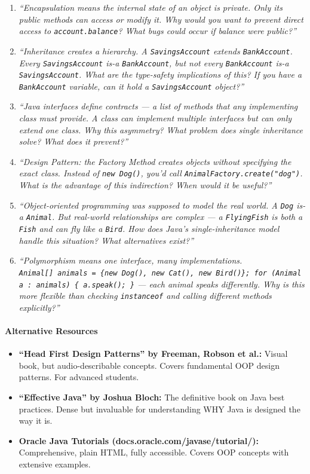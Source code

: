 \documentclass[
  justified,
  openright,
]{tufte-book}
\let\paragraph\paragraph
\let\paragraph\paragraph
\providecommand{\tightlist}{%
  \setlength{\itemsep}{0pt}\setlength{\parskip}{0pt}}
\begin{document}
\begin{enumerate}
\def\labelenumi{\arabic{enumi}.}
\item
  \emph{``Encapsulation means the internal state of an object is
  private. Only its public methods can access or modify it. Why would
  you want to prevent direct access to \texttt{account.balance}? What
  bugs could occur if balance were public?''}
\item
  \emph{``Inheritance creates a hierarchy. A \texttt{SavingsAccount}
  extends \texttt{BankAccount}. Every \texttt{SavingsAccount} is-a
  \texttt{BankAccount}, but not every \texttt{BankAccount} is-a
  \texttt{SavingsAccount}. What are the type-safety implications of
  this? If you have a \texttt{BankAccount} variable, can it hold a
  \texttt{SavingsAccount} object?''}
\item
  \emph{``Java interfaces define contracts --- a list of methods that
  any implementing class must provide. A class can implement multiple
  interfaces but can only extend one class. Why this asymmetry? What
  problem does single inheritance solve? What does it prevent?''}
\item
  \emph{``Design Pattern: the Factory Method creates objects without
  specifying the exact class. Instead of \texttt{new\ Dog()}, you'd call
  \texttt{AnimalFactory.create("dog")}. What is the advantage of this
  indirection? When would it be useful?''}
\item
  \emph{``Object-oriented programming was supposed to model the real
  world. A \texttt{Dog} is-a \texttt{Animal}. But real-world
  relationships are complex --- a \texttt{FlyingFish} is both a
  \texttt{Fish} and can fly like a \texttt{Bird}. How does Java's
  single-inheritance model handle this situation? What alternatives
  exist?''}
\item
  \emph{``Polymorphism means one interface, many implementations.
  \texttt{Animal{[}{]}\ animals\ =\ \{new\ Dog(),\ new\ Cat(),\ new\ Bird()\};\ for\ (Animal\ a\ :\ animals)\ \{\ a.speak();\ \}}
  --- each animal speaks differently. Why is this more flexible than
  checking \texttt{instanceof} and calling different methods
  explicitly?''}
\end{enumerate}

\paragraph{Alternative Resources}\label{alternative-resources}

\begin{itemize}
\tightlist
\item
  \textbf{``Head First Design Patterns'' by Freeman, Robson et al.:}
  Visual book, but audio-describable concepts. Covers fundamental OOP
  design patterns. For advanced students.
\item
  \textbf{``Effective Java'' by Joshua Bloch:} The definitive book on
  Java best practices. Dense but invaluable for understanding WHY Java
  is designed the way it is.
\item
  \textbf{Oracle Java Tutorials (docs.oracle.com/javase/tutorial/):}
  Comprehensive, plain HTML, fully accessible. Covers OOP concepts with
  extensive examples.
\end{itemize}
\end{document}

